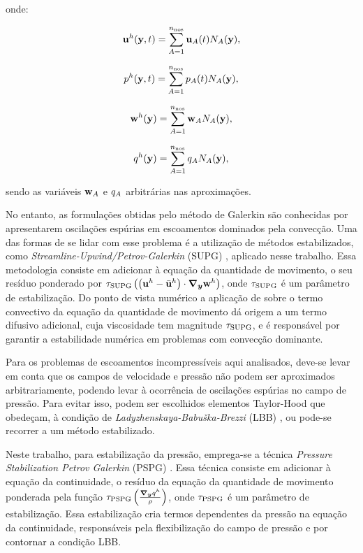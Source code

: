 \documentclass[tese_patricia]{subfiles}%
\begin{document}
\noindent onde:

\begin{align}
\mathbf{u}^h(\mathbf{y},t) = \sum_{A = 1}^{n_{\mathrm{nos}}} \mathbf{u}_{A}(t)N_{A}(\mathbf{y}), \label{eq:interp_vel}
\end{align}

\begin{align}
p^h(\mathbf{y},t)  = \sum_{A = 1}^{n_{\mathrm{nos}}} p_{A}(t)N_{A}(\mathbf{y}),\label{eq:interp_press} 
\end{align}

\begin{align}
\mathbf{w}^h(\mathbf{y})  = \sum_{A = 1}^{n_{\mathrm{nos}}} \mathbf{w}_{A}N_{A}(\mathbf{y}), \label{eq:interp_utest}
\end{align}

\begin{align}
q^h(\mathbf{y})  = \sum_{A = 1}^{n_{\mathrm{nos}}} q_{A}N_{A}(\mathbf{y}), \label{eq:inter_ptest} 
\end{align}

\noindent sendo as variáveis $\mathbf{w}_{A}$ e $q_{A}$ arbitrárias nas aproximações.

No entanto, as formulações obtidas pelo método de Galerkin são conhecidas por apresentarem oscilações espúrias em escoamentos dominados pela convecção. Uma das formas de se lidar com esse problema é a utilização de métodos estabilizados, como \textit{Streamline-Upwind/Petrov-Galerkin} (SUPG) \cite{BrooksH:1982, HughesT:1984}, aplicado nesse trabalho. Essa metodologia consiste em adicionar à equação da quantidade de movimento, o seu resíduo ponderado por $\tau_{\mathrm{SUPG}} \left(\left(\mathbf{u}^h - \bar{\mathbf{u}}^h \right) \cdot \boldsymbol{\nabla_y} \mathbf{w}^h\right)$, onde $\tau_{\mathrm{SUPG}}$ é um parâmetro de estabilização. Do ponto de vista numérico a aplicação de  sobre o termo convectivo da equação da quantidade de movimento dá origem a um termo difusivo adicional, cuja viscosidade tem magnitude $\tau_{\mathrm{SUPG}}$, e é responsável por garantir a estabilidade numérica em problemas com convecção dominante.

Para os problemas de escoamentos incompressíveis aqui analisados, deve-se levar em conta que os campos de velocidade e pressão não podem ser aproximados arbitrariamente, podendo levar à ocorrência de oscilações espúrias no campo de pressão. Para evitar isso, podem ser escolhidos elementos Taylor-Hood que obedeçam, à condição de \textit{Ladyzhenskaya-Babuška-Brezzi} (LBB) \cite{BrezziF:1991,ZienkiewiczTN:2005,StrangF:2008}, ou pode-se recorrer a um método estabilizado. 

Neste trabalho, para estabilização da pressão, emprega-se a técnica \textit{Pressure Stabilization Petrov Galerkin} (PSPG)   \cite{HughesFB:1986,TezduyarMRS:1992a}. Essa técnica consiste em adicionar à equação da continuidade, o resíduo da equação da quantidade de movimento ponderada pela função $\tau_{\mathrm{PSPG}} \left(\frac{\boldsymbol{\nabla_y} q^h}{\rho}\right)$, onde $\tau_{\mathrm{PSPG}}$ é um parâmetro de estabilização. Essa estabilização cria termos dependentes da pressão na equação da continuidade, responsáveis pela flexibilização do campo de pressão e por contornar a condição LBB.
\end{document}
